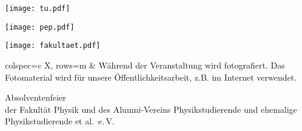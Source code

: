 \documentclass[paper=landscape]{scrartcl}
\begin{document}
\begin{minipage}{0.44\textwidth}%
  \texttt{[image: tu.pdf]}%
\end{minipage}%
\begin{minipage}{0.25\textwidth}%
  \centering
  \texttt{[image: pep.pdf]}%
\end{minipage}%
\begin{minipage}{0.29\textwidth}%
  \raggedleft%
  \texttt{[image: fakultaet.pdf]}%
\end{minipage}%

\vfill

\begin{center}
    \begin{tblr}{colspec={c X}, rows={m}}
        {%
            \fontsize{140}{160}\selectfont\color{tu}%
            \vspace{-.5em}
        }%
        &
        {%
            \fontsize{30}{35}\selectfont
            Während der Veranstaltung wird fotografiert.
            Das Fotomaterial
            wird für unsere Öffentlichkeitsarbeit, z.B.
            im Internet verwendet.
        }\\
    \end{tblr}
\end{center}

\vfill

\begin{center}
  \huge Absolventenfeier\\
  der Fakultät Physik und des Alumni-Vereins
  Physikstudierende und ehemalige Physikstudierende et al.\ e.\,V.
\end{center}
  
\end{document}
